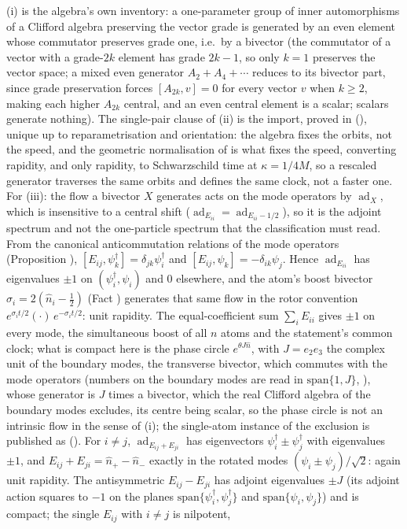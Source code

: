 (i) is the algebra's own inventory: a one-parameter group of inner automorphisms of a Clifford algebra preserving the vector grade is generated by an even element whose commutator preserves grade one, i.e.\ by a bivector (the commutator of a vector with a grade-$2k$ element has grade $2k - 1$, so only $k = 1$ preserves the vector space; a mixed even generator $A_2 + A_4 + \cdots$ reduces to its bivector part, since grade preservation forces $[A_{2k}, v] = 0$ for every vector $v$ when $k \geq 2$, making each higher $A_{2k}$ central, and an even central element is a scalar; scalars generate nothing). The single-pair clause of (ii) is the import, proved in \cite[Prop.~2.1]{ButlerT7} (), unique up to reparametrisation and orientation: the algebra fixes the orbits, not the speed, and the geometric normalisation of \cite[App.~A]{ButlerT5} is what fixes the speed, converting rapidity, and only rapidity, to Schwarzschild time at $\kappa = 1/4M$, so a rescaled generator traverses the same orbits and defines the same clock, not a faster one. For (iii): the flow a bivector $X$ generates acts on the mode operators by $\operatorname{ad}_X$, which is insensitive to a central shift ($\operatorname{ad}_{E_{ii}} = \operatorname{ad}_{E_{ii} - 1/2}$), so it is the adjoint spectrum and not the one-particle spectrum that the classification must read. From the canonical anticommutation relations of the mode operators (Proposition ), $[E_{ij}, \psi_k^\dagger] = \delta_{jk}\psi_i^\dagger$ and $[E_{ij}, \psi_k] = -\delta_{ik}\psi_j$. Hence $\operatorname{ad}_{E_{ii}}$ has eigenvalues $\pm 1$ on $(\psi_i^\dagger, \psi_i)$ and $0$ elsewhere, and the atom's boost bivector $\sigma_i = 2(\hat n_i - \tfrac12)$ (Fact ) generates that same flow in the rotor convention $e^{\sigma_i t/2}(\cdot)\,e^{-\sigma_i t/2}$: unit rapidity. The equal-coefficient sum $\sum_i E_{ii}$ gives $\pm 1$ on every mode, the simultaneous boost of all $n$ atoms and the statement's common clock; what is compact here is the phase circle $e^{\theta J\hat n}$, with $J = e_2e_3$ the complex unit of the boundary modes, the transverse bivector, which commutes with the mode operators (numbers on the boundary modes are read in $\mathrm{span}\{1, J\}$, ), whose generator is $J$ times a bivector, which the real Clifford algebra of the boundary modes excludes, its centre being scalar, so the phase circle is not an intrinsic flow in the sense of (i); the single-atom instance of the exclusion is published as \cite[Prop.~7.21(3)]{ButlerT5} (). For $i \neq j$, $\operatorname{ad}_{E_{ij} + E_{ji}}$ has eigenvectors $\psi_i^\dagger \pm \psi_j^\dagger$ with eigenvalues $\pm 1$, and $E_{ij} + E_{ji} = \hat n_+ - \hat n_-$ exactly in the rotated modes $(\psi_i \pm \psi_j)/\sqrt{2}$: again unit rapidity. The antisymmetric $E_{ij} - E_{ji}$ has adjoint eigenvalues $\pm J$ (its adjoint action squares to $-1$ on the planes $\mathrm{span}\{\psi_i^\dagger, \psi_j^\dagger\}$ and $\mathrm{span}\{\psi_i, \psi_j\}$) and is compact; the single $E_{ij}$ with $i \neq j$ is nilpotent, 